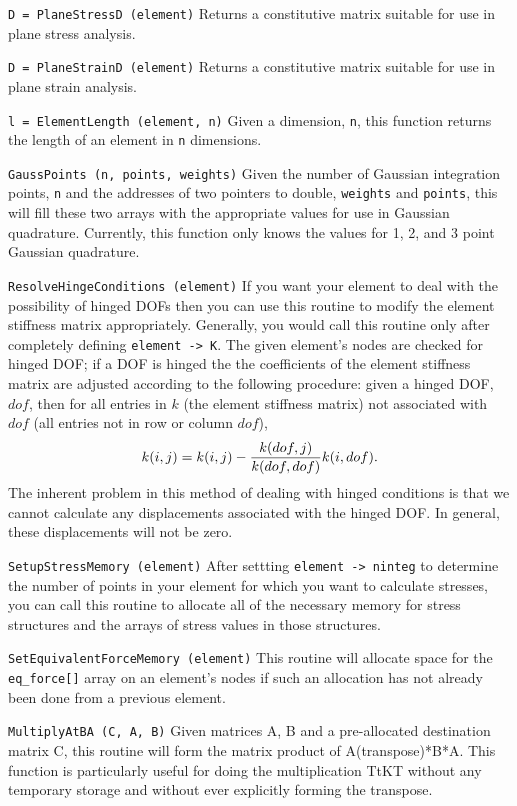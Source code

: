 \begin{dispitems}
\item [\tt D = PlaneStressD (element)]
 Returns a constitutive matrix suitable for use in plane stress analysis.

\item [\tt D = PlaneStrainD (element)]
 Returns a constitutive matrix suitable for use in plane strain analysis.

\item [\tt l = ElementLength (element, n)]
 Given a dimension, {\tt n}, this function returns the length of an 
 element in {\tt n} dimensions.

\item [\tt GaussPoints (n, points, weights)]
 Given the number of Gaussian integration points, {\tt n} and the addresses
 of two pointers to double, {\tt weights} and {\tt points}, this will fill 
 these two arrays with the appropriate values for use in Gaussian quadrature.  
 Currently, this function only knows the values for 1, 2, and 3 point
 Gaussian quadrature. 

\item [\tt ResolveHingeConditions (element)]
 If you want your element to deal with the possibility of hinged DOFs then
 you can use this routine to modify the element stiffness matrix 
 appropriately. Generally, you would call this routine only after completely
 defining \mbox{{\tt element -> K}}.  The given element's nodes are checked for 
 hinged DOF; if a DOF is hinged the the coefficients of
 the element stiffness matrix are adjusted according to the following
 procedure: given a hinged DOF, $dof$, then for all entries in 
 $k$ (the element stiffness matrix) not associated with $dof$ (all entries
 not in row or column $dof$), 
\begin{equation}
 k(i,j) = k(i,j) - {k(dof,j) \over k(dof,dof)}k(i,dof).
\end{equation}
 The inherent problem in this method of dealing with hinged conditions is
 that we cannot calculate any displacements associated with the hinged DOF.
 In general, these displacements will not be zero. 

\item [\tt SetupStressMemory (element)]
 After settting \mbox{{\tt element -> ninteg}} to determine the number of 
 points in your element for which you want to calculate stresses, you
 can call this routine to allocate all of the necessary memory for
 stress structures and the arrays of stress values in those structures.

\item [\tt SetEquivalentForceMemory (element)]
 This routine will allocate space for the {\tt eq\_force[]} array on an
 element's nodes if such an allocation has not already been done from
 a previous element.

\item [\tt MultiplyAtBA (C, A, B)]
 Given matrices A, B and a pre-allocated destination matrix C, this routine
 will form the matrix product of A(transpose)*B*A.  This function is
 particularly useful for doing the multiplication TtKT without any
 temporary storage and without ever explicitly forming the transpose.
\end{dispitems}

